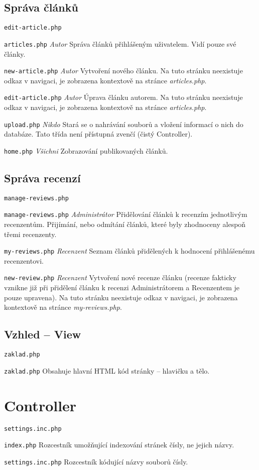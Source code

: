 \subsection{Správa článků}
\begin{labeling}{\texttt{edit-article.php}}
\item [\texttt{articles.php}] \emph{Autor} Správa článků přihlášeným uživatelem. Vidí pouze své články.
\item [\texttt{new-article.php}] \emph{Autor} Vytvoření nového článku. Na tuto stránku neexistuje odkaz v navigaci, je zobrazena kontextově na stránce \emph{articles.php}.
\item [\texttt{edit-article.php}] \emph{Autor} Úprava článku autorem. Na tuto stránku neexistuje odkaz v navigaci, je zobrazena kontextově na stránce \emph{articles.php}.
\item [\texttt{upload.php}] \emph{Nikdo} Stará se o nahrávání souborů a vložení informací o nich do databáze. Tato třída není přístupná zvenčí (čistý Controller).
\item [\texttt{home.php}] \emph{Všichni} Zobrazování publikovaných článků.
\end{labeling}

\subsection{Správa recenzí}
\begin{labeling}{\texttt{manage-reviews.php}}
\item [\texttt{manage-reviews.php}] \emph{Administrátor} Přidělování článků k recenzím jednotlivým recenzentům. Přijímání, nebo odmítání článků, které byly zhodnoceny alespoň třemi recenzenty.
\item [\texttt{my-reviews.php}] \emph{Recenzent} Seznam článků přidělených k hodnocení přihlášenému recenzentovi.
\item [\texttt{new-review.php}] \emph{Recenzent} Vytvoření nové recenze článku (recenze fakticky vznikne již při přidělení článku k recenzi Administrátorem a Recenzentem je pouze upravena). Na tuto stránku neexistuje odkaz v navigaci, je zobrazena kontextově na stránce \emph{my-reviews.php}.
\end{labeling}

\subsection{Vzhled -- View}
\begin{labeling}{\texttt{zaklad.php}}
\item [\texttt{zaklad.php}] Obsahuje hlavní HTML kód stránky -- hlavičku a tělo.
\end{labeling}

\section{Controller}
\begin{labeling}{\texttt{settings.inc.php}}
\item [\texttt{index.php}] Rozcestník umožňující indexování stránek čísly, ne jejich názvy.
\item [\texttt{settings.inc.php}] Rozcestník kódující názvy souborů čísly.
\end{labeling}